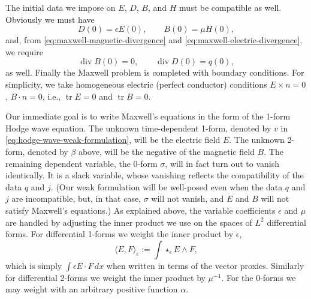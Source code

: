 {The initial data we impose on $E$, $D$, $B$, and $H$ must be compatible as well. Obviously we must have}
\[
D(0)=\epsilon E(0),\qquad B(0)=\mu H(0),
\]
{and, from \eqref{eq:maxwell-magnetic-divergence} and \eqref{eq:maxwell-electric-divergence}, we require}
\[
\operatorname{div}B(0)=0,\qquad\operatorname{div}D(0)=q(0),
\]
{as well. Finally the Maxwell problem is completed with boundary conditions. For simplicity, we take homogeneous electric (perfect conductor) conditions $E\times n=0$, $B\cdot n=0$, i.e., $\operatorname{tr}E=0$ and $\operatorname{tr}B=0$.}

{Our immediate goal is to write Maxwell's equations in the form of the 1-form Hodge wave equation. The unknown time-dependent 1-form, denoted by $v$ in \eqref{eq:hodge-wave-weak-formulation}, will be the electric field $E$. The unknown 2-form, denoted by $\beta$ above, will be the negative of the magnetic field $B$. The remaining dependent variable, the 0-form $\sigma$, will in fact turn out to vanish identically. It is a slack variable, whose vanishing reflects the compatibility of the data $q$ and $j$. (Our weak formulation will be well-posed even when the data $q$ and $j$ are incompatible, but, in that case, $\sigma$ will not vanish, and $E$ and $B$ will not satisfy Maxwell's equations.) As explained above, the variable coefficients $\epsilon$ and $\mu$ are handled by adjusting the inner product we use on the spaces of $L^2$ differential forms. For differential 1-forms we weight the inner product by $\epsilon$,}
\[
\langle E,F\rangle_\epsilon:=\int\star_\epsilon E\wedge F,
\]
{which is simply $\int\epsilon E\cdot F\,dx$ when written in terms of the vector proxies. Similarly for differential 2-forms we weight the inner product by $\mu^{-1}$. For the 0-forms we may weight with an arbitrary positive function $\alpha$.}

